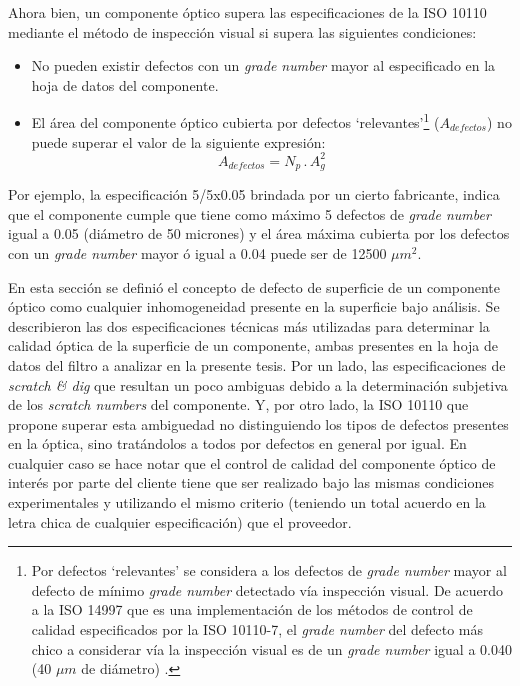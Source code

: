 Ahora bien, un componente óptico supera las especificaciones de la ISO 10110 mediante el método de inspección visual si supera las siguientes condiciones:
\begin{itemize}
\item No pueden existir defectos con un \textit{grade number} mayor al especificado en la hoja de datos del componente.
\item El área del componente óptico cubierta por defectos `relevantes'\footnote{Por defectos `relevantes' se considera a los defectos de \textit{grade number} mayor al defecto de mínimo \textit{grade number} detectado vía inspección visual. De acuerdo a la ISO 14997 que es una implementación de los métodos de control de calidad especificados por la ISO 10110-7, el \textit{grade number} del defecto más chico a considerar vía la inspección visual es de un \textit{grade number} igual a 0.040 (40 $\mu m$ de diámetro) \cite{etsol}.} ($A_{defectos}$) no puede superar el valor de la siguiente expresión:
\begin{equation}
A_{defectos} = N_{p}\hspace{2pt} .\hspace{2pt} A_{g}^{2}
\label{eq:isoarea}
\end{equation}
\end{itemize}
\hspace{0.5cm}Por ejemplo, la especificación 5/5x0.05 brindada por un cierto fabricante, indica que el componente cumple que tiene como máximo 5 defectos de \textit{grade number} igual a 0.05 (diámetro de 50 micrones) y el área máxima cubierta por los defectos con un \textit{grade number} mayor ó igual a 0.04 puede ser de 12500 $\mu m^{2}$.

 En esta sección se definió el concepto de defecto de superficie de un componente óptico como cualquier inhomogeneidad presente en la superficie bajo análisis. Se describieron las dos especificaciones técnicas más utilizadas para determinar la calidad óptica de la superficie de un componente, ambas presentes en la hoja de datos del filtro a analizar en la presente tesis. Por un lado, las especificaciones de \textit{scratch \& dig} que resultan un poco ambiguas debido a la determinación subjetiva de los \textit{scratch numbers} del componente. Y, por otro lado, la ISO 10110 que propone superar esta ambiguedad no distinguiendo los tipos de defectos presentes en la óptica, sino tratándolos a todos por defectos en general por igual. En cualquier caso se hace notar que el control de calidad del componente óptico de interés por parte del cliente tiene que ser realizado bajo las mismas condiciones experimentales y utilizando el mismo criterio (teniendo un total acuerdo en la letra chica de cualquier especificación) que el proveedor.
 
